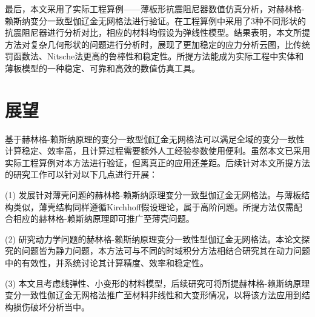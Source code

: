 最后，本文采用了实际工程算例——薄板形抗震阻尼器数值仿真分析，对赫林格-赖斯纳变分一致型伽辽金无网格法进行验证。在工程算例中采用了3种不同形状的抗震阻尼器进行分析对比，相应的材料均假设为弹线性模型。结果表明，本文所提方法对复杂几何形状的问题进行分析时，展现了更加稳定的应力分析云图，比传统罚函数法、Nitsche法更高的鲁棒性和稳定性。所提方法能成为实际工程中实体和薄板模型的一种稳定、可靠和高效的数值仿真工具。

\section{展望}
基于赫林格-赖斯纳原理的变分一致型伽辽金无网格法可以满足全域的变分一致性计算稳定、效率高，且计算过程需要额外人工经验参数使用便利。虽然本文已采用实际工程算例对本方法进行验证，但离真正的应用还差距。后续针对本文所提方法的研究工作可以针对以下几点进行开展：

(1) 发展针对薄壳问题的赫林格-赖斯纳原理变分一致型伽辽金无网格法。与薄板结构类似，薄壳结构同样遵循Kirchhoff假设理论，属于高阶问题。所提方法仅需配合相应的赫林格-赖斯纳原理即可推广至薄壳问题。

(2) 研究动力学问题的赫林格-赖斯纳原理变分一致性型伽辽金无网格法。本论文探究的问题皆为静力问题，本方法可与不同的时域积分方法相结合研究其在动力问题中的有效性，并系统讨论其计算精度、效率和稳定性。

(3) 本文且考虑线弹性、小变形的材料模型，后续研究可将所提赫林格-赖斯纳原理变分一致性伽辽金无网格法推广至材料非线性和大变形情况，以将该方法应用到结构损伤破坏分析当中。
